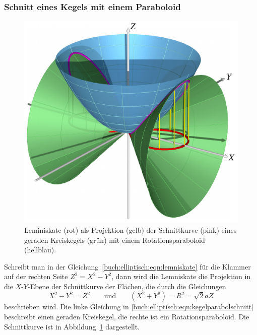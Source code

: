 \subsubsection{Schnitt eines Kegels mit einem Paraboloid}
\begin{figure}
\center
\includegraphics{chapters/110-elliptisch/images/kegelpara.pdf}
\caption{Leminiskate (rot) als Projektion (gelb) der Schnittkurve (pink)
eines geraden
Kreiskegels (grün) mit einem Rotationsparaboloid (hellblau).
\label{buch:elliptisch:lemniskate:kegelpara}}
\end{figure}%
%
%
Schreibt man in der Gleichung~\eqref{buch:elliptisch:eqn:lemniskate}
für die Klammer auf der rechten Seite $Z^2 = X^2 - Y^2$, dann wird die
Lemniskate die Projektion in die $X$-$Y$-Ebene der Schnittkurve der Flächen,
die durch die Gleichungen
\begin{equation}
X^2-Y^2 = Z^2
\qquad\text{und}\qquad
(X^2+Y^2) = R^2 = \sqrt{2}aZ
\label{buch:elliptisch:eqn:kegelparabolschnitt}
\end{equation}
beschrieben wird.
Die linke Gleichung in 
\eqref{buch:elliptisch:eqn:kegelparabolschnitt}
beschreibt einen geraden Kreiskegel, die rechte ist ein Rotationsparaboloid.
Die Schnittkurve ist in Abbildung~\ref{buch:elliptisch:lemniskate:kegelpara}
dargestellt.

